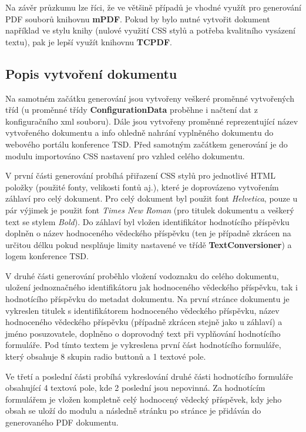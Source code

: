 \par
Na závěr průzkumu lze říci, že ve většině případů je vhodné využít pro generování PDF souborů knihovnu \textbf{mPDF}. Pokud by bylo nutné vytvořit dokument například ve stylu knihy (nulové využití CSS stylů a potřeba kvalitního vysázení textu), pak je lepší využít knihovnu \textbf{TCPDF}. 

\subsection{Popis vytvoření dokumentu}
Na samotném začátku generování jsou vytvořeny veškeré proměnné vytvořených tříd (u proměnné třídy \textbf{ConfigurationData} proběhne i načtení dat z konfiguračního xml souboru). Dále jsou vytvořeny proměnné reprezentující název vytvořeného dokumentu a info ohledně nahrání vyplněného dokumentu do webového portálu konference TSD. Před samotným začátkem generování je do modulu importováno CSS nastavení pro vzhled celého dokumentu.
\par
V první části generování probíhá přiřazení CSS stylů pro jednotlivé HTML položky (použité fonty, velikosti fontů aj.), které je doprovázeno vytvořením záhlaví pro celý dokument. Pro celý dokument byl použit font \textit{Helvetica}, pouze u pár výjimek je použit font \textit{Times New Roman} (pro titulek dokumentu a veškerý text se stylem \textit{Bold}).  Do záhlaví byl vložen identifikátor hodnotícího příspěvku doplněn o název hodnoceného vědeckého příspěvku (ten je případně zkrácen na určitou délku pokud nesplňuje limity nastavené ve třídě \textbf{TextConversioner}) a logem konference TSD. 
\par
V druhé části generování proběhlo vložení vodoznaku do celého dokumentu, uložení jednoznačného identifikátoru jak hodnoceného vědeckého příspěvku, tak i hodnotícího příspěvku do metadat dokumentu. Na první stránce dokumentu je vykreslen titulek s identifikátorem hodnoceného vědeckého příspěvku, název hodnoceného vědeckého příspěvku (případně zkrácen stejně jako u záhlaví) a jméno posuzovatele, doplněno o doprovodný text při vyplňování hodnotícího formuláře. Pod tímto textem je vykreslena první část hodnotícího formuláře, který obsahuje 8 skupin radio buttonů a 1 textové pole.
\par
Ve třetí a poslední části probíhá vykreslování druhé části hodnotícího formuláře obsahující 4 textová pole, kde 2 poslední jsou nepovinná. Za hodnotícím formulářem je vložen kompletně celý hodnocený vědecký příspěvek, kdy jeho obsah se uloží do modulu a následně stránku po stránce je přidáván do generovaného PDF dokumentu.
